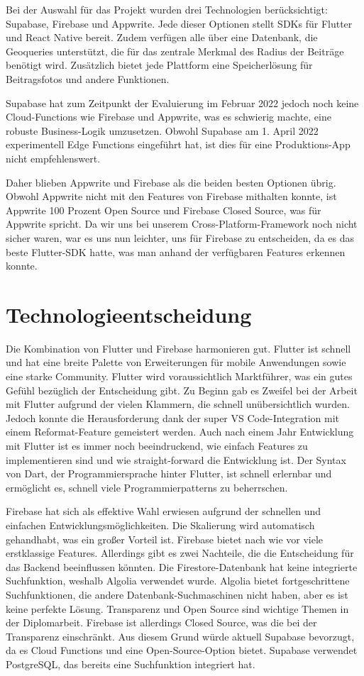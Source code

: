 Bei der Auswahl für das Projekt wurden drei Technologien berücksichtigt: Supabase, Firebase und Appwrite. Jede dieser Optionen stellt SDKs für Flutter und React Native bereit. Zudem verfügen alle über eine Datenbank, die Geoqueries unterstützt, die für das zentrale Merkmal des Radius der Beiträge benötigt wird. Zusätzlich bietet jede Plattform eine Speicherlösung für Beitragsfotos und andere Funktionen.

Supabase hat zum Zeitpunkt der Evaluierung im Februar 2022 jedoch noch keine Cloud-Functions wie Firebase und Appwrite, was es schwierig machte, eine robuste Business-Logik umzusetzen. Obwohl Supabase am 1. April 2022 experimentell Edge Functions eingeführt hat, ist dies für eine Produktions-App nicht empfehlenswert.

Daher blieben Appwrite und Firebase als die beiden besten Optionen übrig. Obwohl Appwrite nicht mit den Features von Firebase mithalten konnte, ist Appwrite 100 Prozent Open Source und Firebase Closed Source, was für Appwrite spricht. Da wir uns bei unserem Cross-Platform-Framework noch nicht sicher waren, war es uns nun leichter, uns für Firebase zu entscheiden, da es das beste Flutter-SDK hatte, was man anhand der verfügbaren Features erkennen konnte.

\section{Technologieentscheidung}
Die Kombination von Flutter und Firebase harmonieren gut. Flutter ist schnell und hat eine breite Palette von Erweiterungen für mobile Anwendungen sowie eine starke Community. Flutter wird voraussichtlich Marktführer, was ein gutes Gefühl bezüglich der Entscheidung gibt. Zu Beginn gab es Zweifel bei der Arbeit mit Flutter aufgrund der vielen Klammern, die schnell unübersichtlich wurden. Jedoch konnte die Herausforderung dank der super VS Code-Integration mit einem Reformat-Feature gemeistert werden. Auch nach einem Jahr Entwicklung mit Flutter ist es immer noch beeindruckend, wie einfach Features zu implementieren sind und wie straight-forward die Entwicklung ist. Der Syntax von Dart, der Programmiersprache hinter Flutter, ist schnell erlernbar und ermöglicht es, schnell viele Programmierpatterns zu beherrschen.

Firebase hat sich als effektive Wahl erwiesen aufgrund der schnellen und einfachen Entwicklungsmöglichkeiten. Die Skalierung wird automatisch gehandhabt, was ein großer Vorteil ist. Firebase bietet nach wie vor viele erstklassige Features. Allerdings gibt es zwei Nachteile, die die Entscheidung für das Backend beeinflussen könnten. Die Firestore-Datenbank hat keine integrierte Suchfunktion, weshalb Algolia verwendet wurde. Algolia bietet fortgeschrittene Suchfunktionen, die andere Datenbank-Suchmaschinen nicht haben, aber es ist keine perfekte Lösung. Transparenz und Open Source sind wichtige Themen in der Diplomarbeit. Firebase ist allerdings Closed Source, was die bei der Transparenz einschränkt. Aus diesem Grund würde aktuell Supabase bevorzugt, da es Cloud Functions und eine Open-Source-Option bietet. Supabase verwendet PostgreSQL, das bereits eine Suchfunktion integriert hat.
